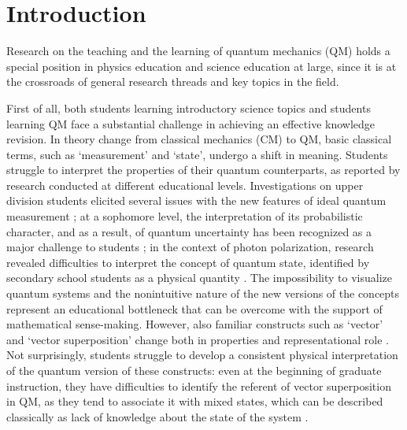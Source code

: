 \documentclass[twocolumn,secnumarabic,amssymb, nobibnotes, aps, prd, nofootinbib]{revtex4-2}
\begin{document}
\maketitle

\section{Introduction} \label{Sec:Intro}
Research on the teaching and the learning of quantum mechanics (QM) holds a special position in physics education and science education at large, since it is at the crossroads of general research threads and key topics in the field.

First of all, both students learning introductory science topics and students learning QM face a substantial challenge in achieving an effective knowledge revision. In theory change from classical mechanics (CM) to QM, basic classical terms, such as `measurement' and `state', undergo a shift in meaning. Students struggle to interpret the properties of their quantum counterparts, as reported by research conducted at different educational levels. Investigations on upper division students elicited several issues with the new features of ideal quantum measurement \cite{Zhu2012}; at a sophomore level, the interpretation of its probabilistic character, and as a result, of quantum uncertainty has been recognized as a major challenge to students \cite{Ayene2011};  in the context of photon polarization, research revealed difficulties to interpret the concept of quantum state, identified by secondary school students as a physical quantity \cite{Pospiech2021}. The impossibility to visualize quantum systems and the nonintuitive nature of the new versions of the concepts represent an educational bottleneck that can be overcome with the support of mathematical sense-making. However, also familiar constructs such as `vector' and `vector superposition' change both in properties and representational role \cite{Pospiech2021}. Not surprisingly, students struggle to develop a consistent physical interpretation of the quantum version of these constructs: even at the beginning of graduate instruction, they have difficulties to identify the referent of vector superposition in QM, as they tend to associate it with mixed states, which can be described classically as lack of knowledge about the state of the system \cite{Passante2015}.
\end{document}
